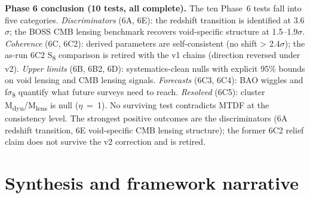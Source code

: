 \documentclass[11pt,a4paper]{article}
\begin{document}
\begin{mdframed}[linecolor=accent,linewidth=0.5pt,backgroundcolor=callout-bg,leftline=true,rightline=true,topline=true,bottomline=true,innerleftmargin=8pt,innerrightmargin=8pt,innertopmargin=6pt,innerbottommargin=6pt]
\textbf{Phase 6 conclusion (10 tests, all complete).}
The ten Phase~6 tests fall into five categories. \emph{Discriminators} (6A, 6E): the redshift transition is identified at 3.6$\sigma$; the BOSS CMB lensing benchmark recovers void-specific structure at 1.5--1.9$\sigma$. \emph{Coherence} (6C, 6C2): derived parameters are self-consistent (no shift > 2.4$\sigma$); the as-run 6C2 S\textsubscript{8} comparison is retired with the v1 chains (direction reversed under v2). \emph{Upper limits} (6B, 6B2, 6D): systematics-clean nulls with explicit 95\% bounds on void lensing and CMB lensing signals. \emph{Forecasts} (6C3, 6C4): BAO wiggles and f$\sigma$\textsubscript{8} quantify what future surveys need to reach. \emph{Resolved} (6C5): cluster M\textsubscript{dyn}/M\textsubscript{lens} is null ($\eta$~=~1). No surviving test contradicts MTDF at the consistency level. The strongest positive outcomes are the discriminators (6A redshift transition, 6E void-specific CMB lensing structure); the former 6C2 relief claim does not survive the v2 correction and is retired.
\end{mdframed}

\section{Synthesis and framework narrative}
\label{sec:sec7}
\end{document}
